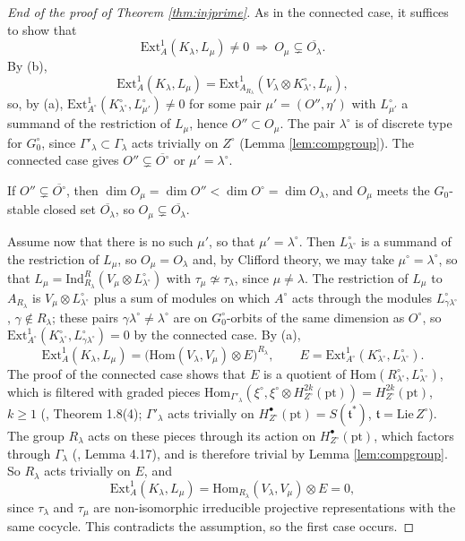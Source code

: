 \documentclass[a4paper,12pt,leqno]{amsart}
\theoremstyle{plain}
\theoremstyle{definition}
\begin{document}
\begin{proof}[End of the proof of Theorem \ref{thm:injprime}]
As in the connected case, it suffices to show that
\[\mathrm{Ext}^1_A(K_\lambda,L_\mu)\neq0\ \Longrightarrow\ O_\mu\subsetneq\overline{O_\lambda}.\] By (b),
\[\mathrm{Ext}^1_A(K_\lambda,L_\mu)=\mathrm{Ext}^1_{A_{R_\lambda}}(V_\lambda\otimes K^\circ_{\lambda^\circ},L_\mu),\]
so, by (a), $\mathrm{Ext}^1_{A^\circ}(K^\circ_{\lambda^\circ},L^\circ_{\mu'})\neq0$ for some pair $\mu'=(O'',\eta')$
with $L^\circ_{\mu'}$ a summand of the restriction of $L_\mu$, hence $O''\subset O_\mu$. The pair
$\lambda^\circ$ is of discrete type for $G_0^\circ$, since $\Gamma'_\lambda\subset\Gamma_\lambda$ acts trivially on
$Z^\circ$ (Lemma \ref{lem:compgroup}). The connected case gives $O''\subsetneq\overline{O^\circ}$ or
$\mu'=\lambda^\circ$.

If $O''\subsetneq\overline{O^\circ}$, then $\dim O_\mu=\dim O''<\dim O^\circ=\dim O_\lambda$, and $O_\mu$ meets the
$G_0$-stable closed set $\overline{O_\lambda}$, so $O_\mu\subsetneq\overline{O_\lambda}$.

Assume now that there is no such $\mu'$, so that $\mu'=\lambda^\circ$. Then $L^\circ_{\lambda^\circ}$ is a
summand of the restriction of $L_\mu$, so $O_\mu=O_\lambda$ and, by Clifford theory, we may take
$\mu^\circ=\lambda^\circ$, so that $L_\mu=\mathrm{Ind}_{R_\lambda}^R(V_\mu\otimes L^\circ_{\lambda^\circ})$ with
$\tau_\mu\not\simeq\tau_\lambda$, since $\mu\neq\lambda$. The restriction of $L_\mu$ to $A_{R_\lambda}$ is
$V_\mu\otimes L^\circ_{\lambda^\circ}$ plus a sum of modules on which $A^\circ$ acts through the modules
$L^\circ_{\gamma\lambda^\circ}$, $\gamma\notin R_\lambda$; these pairs $\gamma\lambda^\circ\neq\lambda^\circ$ are on
$G_0^\circ$-orbits of the same dimension as $O^\circ$, so $\mathrm{Ext}^1_{A^\circ}(K^\circ_{\lambda^\circ},
L^\circ_{\gamma\lambda^\circ})=0$ by the connected case. By (a),
\[\mathrm{Ext}^1_A(K_\lambda,L_\mu)=\big(\mathrm{Hom}(V_\lambda,V_\mu)\otimes E\big)^{R_\lambda},\qquad
E=\mathrm{Ext}^1_{A^\circ}(K^\circ_{\lambda^\circ},L^\circ_{\lambda^\circ}).\]
The proof of the connected case shows that $E$ is a quotient of $\mathrm{Hom}(R^\circ_{\lambda^\circ},
L^\circ_{\lambda^\circ})$, which is filtered with graded pieces
$\mathrm{Hom}_{\Gamma'_\lambda}(\xi^\circ,\xi^\circ\otimes H^{2k}_{Z^\circ}(\mathrm{pt}))=H^{2k}_{Z^\circ}(\mathrm{pt})$, $k\geq1$
(\cite{Kat17}, Theorem 1.8(4); $\Gamma'_\lambda$ acts trivially on $H^\bullet_{Z^\circ}(\mathrm{pt})=S(\mathfrak t^*)$,
$\mathfrak t=\mathrm{Lie}\,Z^\circ$). The group $R_\lambda$ acts on these pieces through its action on
$H^\bullet_{Z^\circ}(\mathrm{pt})$, which factors through $\Gamma_\lambda$ (\cite{AMS18}, Lemma 4.17), and is
therefore trivial by Lemma \ref{lem:compgroup}. So $R_\lambda$ acts trivially on $E$, and
\[\mathrm{Ext}^1_A(K_\lambda,L_\mu)=\mathrm{Hom}_{R_\lambda}(V_\lambda,V_\mu)\otimes E=0,\]
since $\tau_\lambda$ and $\tau_\mu$ are non-isomorphic irreducible projective representations with the same
cocycle. This contradicts the assumption, so the first case occurs.
\end{proof}
\end{document}
